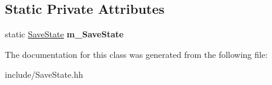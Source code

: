 \subsection*{Static Private Attributes}
\begin{DoxyCompactItemize}
\item 
\hypertarget{class_save_state_a6e0b8e5a745ac639a7397f0cfc983f57}{}static \hyperlink{class_save_state}{Save\+State} {\bfseries m\+\_\+\+Save\+State}\label{class_save_state_a6e0b8e5a745ac639a7397f0cfc983f57}

\end{DoxyCompactItemize}


The documentation for this class was generated from the following file\+:\begin{DoxyCompactItemize}
\item 
include/Save\+State.\+hh\end{DoxyCompactItemize}
